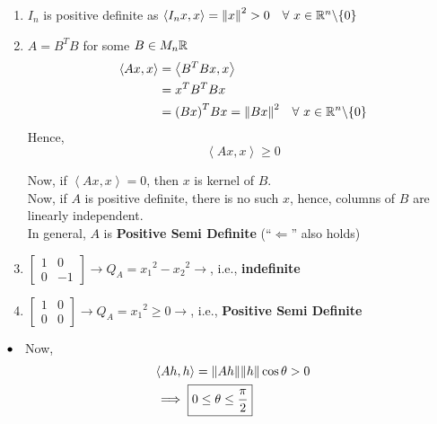\documentclass[../Analysis-3]{subfiles}
\begin{document}
\begin{Eg}{}{}
    \begin{enumerate}
        \item  $I_n$ is positive definite as $\left\langle I_nx, x \right\rangle = {\|x \|}^2 > 0 \quad \forall\ x \in \mathbb{R}^n \backslash \{0\}$
        \item $A = B^TB$ for some $B \in M_n{\mathbb{R}}$
              \begin{align*}
                  \left\langle Ax,x \right\rangle & = \left\langle B^TBx,x \right\rangle                                    \\
                                                  & = x^TB^TBx                                                              \\
                                                  & = {(Bx)}^T Bx = {\| Bx \|}^2 \quad \forall\ x \in \mathbb{R}^n \backslash \{0\}
              \end{align*}
              Hence, \[ \left\langle Ax,x \right\rangle \geq 0 \]

              Now, if $ \left\langle Ax,x \right\rangle = 0 $, then  $x$ is kernel of $B$. \\
              Now, if $A$ is positive definite, there is no such $x$, hence, columns of $B$ are linearly independent. \\
              In general, $A$ is \textbf{Positive Semi Definite} (``$\Longleftarrow$'' also holds)

        \item $\begin{bmatrix}
                      1 & 0  \\
                      0 & -1
                  \end{bmatrix} \longrightarrow Q_A = {x_1}^2 - {x_2}^2 \longrightarrow $, i.e., \textbf{indefinite}
        \item  $\begin{bmatrix}
                      1 & 0 \\
                      0 & 0
                  \end{bmatrix} \longrightarrow Q_A = {x_1}^2 \geq 0 \longrightarrow $, i.e., \textbf{Positive Semi Definite}

    \end{enumerate}
\end{Eg}

$\bullet \hspace{2mm}$ Now,
\begin{align*}
     & \left\langle Ah, h \right\rangle = \norm{Ah}\norm{h}\cos{\theta} > 0 \\
     & \implies \boxed{0 \leq \theta \leq \frac{\pi}{2}}
\end{align*}
\end{document}

